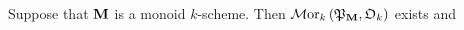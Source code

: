 \begin{proposition}\label{proposition:}
Suppose that $\mathbf{M}$ is a monoid $k$-scheme. Then $\mathcal{M}\mathrm{or}_k\left({\mathfrak P}_{\mathbf{M}},{\mathfrak O}_k\right)$ exists and
\end{proposition}

















































\small






